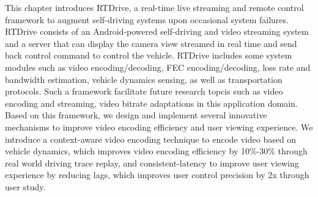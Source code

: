 
This chapter introduces RTDrive, a real-time live streaming and 
remote control framework to augment self-driving
systems upon occasional system failures. 
RTDrive consists of an Android-powered self-driving
and video streaming system and a server that can
display the camera view streamed in real time 
and send back control command to control the
vehicle. 
RTDrive includes some system modules 
such as video encoding/decoding, FEC encoding/decoding,
loss rate and bandwidth estimation, vehicle dynamics
sensing, as well as transportation protocols. 
Such a framework facilitate future research topcis such as
video encoding and streaming, video bitrate adaptations
in this application domain. 
Based on this framework, 
we design and implement several innovative mechanisms to improve
video encoding efficiency and user viewing experience.
We introduce a context-aware video encoding technique
to encode video based on vehicle dynamics, 
which improves video encoding efficiency by 10\%-30\%
through real world driving trace replay,
and consistent-latency to improve user viewing experience
by reducing lags, which improves user control
precision by 2x through user study. 
 

